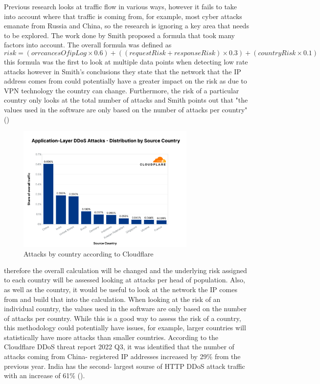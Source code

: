 Previous research looks at traffic flow in various ways, however it fails to take into account where that traffic is coming from, for example, most cyber attacks emanate from Russia and China, so the research is ignoring a key area that needs to be explored. The work done by Smith proposed a formula that took many factors  into account. The overall formula was defined as  \[risk = (orrcancesOfipLog \times 0.6) + ((requestRisk+responseRisk) \times 0.3) + (countryRisk \times  0.1) \] this formula was the first to look at multiple data points when detecting low rate attacks however in Smith's conclusions 
they state that the network that the IP address comes from could potentially have a greater impact on the risk as due to VPN technology the country can change. Furthermore, the risk of a particular country only looks at the total number of attacks and Smith points out that  "the values used in the software are only based on the number of attacks per country" (\cite{smith}) 
\begin{figure}
\label{web using h2}
    \includegraphics[width=88mm,scale=0.8]{images/CF q3.png} 
    \caption{Attacks by country according to Cloudflare}
\end{figure}
therefore the overall calculation will be changed and the underlying risk assigned to each country will be assessed looking at attacks per head of population. Also, as well as the country, it would be useful to look at the network the IP comes from and build that into the calculation. When looking at the risk of an individual country, the values used in the software are only based on the number of attacks per country. While this is a good way to assess the risk of a country, this methodology could potentially have issues, for example, larger countries will statistically have more attacks than smaller countries. According to the Cloudflare DDoS threat report 2022 Q3, it was identified that the number of attacks coming from China- registered IP addresses increased by 29\% from the previous year. India has the second- largest sourse of HTTP DDoS attack traffic with an increase of 61\% (\cite{Q3attacks}).

